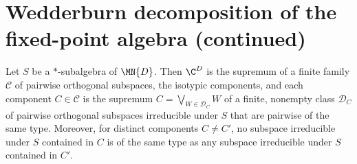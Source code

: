 \section{Wedderburn decomposition of the fixed-point algebra (continued)}

\begin{theorem}%
    \label{thm:starSubalgebra_orthogonal_isotypic_decomposition}
    \leanok
    Let $S$ be a $*$-subalgebra of $\MN{D}$. Then $\C^D$ is the supremum of a finite family $\mathcal{C}$ of pairwise orthogonal subspaces, the
    isotypic components, and each component $C\in\mathcal{C}$ is the supremum $C=\bigvee_{W\in\mathcal{D}_C}W$ of a finite, nonempty class
    $\mathcal{D}_C$ of pairwise orthogonal subspaces irreducible under $S$ that are pairwise of the same type. Moreover, for distinct components
    $C\neq C'$, no subspace irreducible under $S$ contained in $C$ is of the same type as any subspace irreducible under $S$ contained in $C'$.
\end{theorem}

